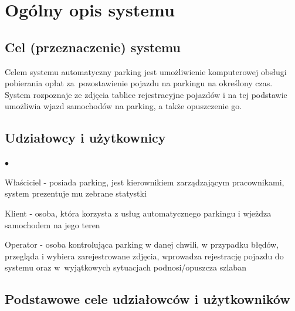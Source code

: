 \chapter{Ogólny opis systemu}
\label{cha:wprowadzenie}


\section{Cel (przeznaczenie) systemu}
\label{sec:celePracy}

Celem systemu automatyczny parking jest umożliwienie komputerowej obsługi pobierania opłat za~pozostawienie pojazdu na parkingu na określony czas. System rozpoznaje ze zdjęcia tablice rejestracyjne pojazdów i na tej podstawie umożliwia wjazd samochodów na parking, a także opuszczenie go.

\section{Udziałowcy i użytkownicy}

\begin{list}{$\bullet$}{}
\item Właściciel - posiada parking, jest kierownikiem zarządzającym pracownikami, system prezentuje mu zebrane statystki
\item Klient - osoba, która korzysta z usług automatycznego parkingu i wjeżdza samochodem na jego teren
\item Operator - osoba kontrolująca parking w danej chwili, w przypadku błędów, przegląda i wybiera zarejestrowane zdjęcia, wprowadza rejestrację pojazdu do systemu oraz w~wyjątkowych sytuacjach podnosi/opuszcza szlaban

\end{list}

\section{Podstawowe cele udziałowców i użytkowników}

